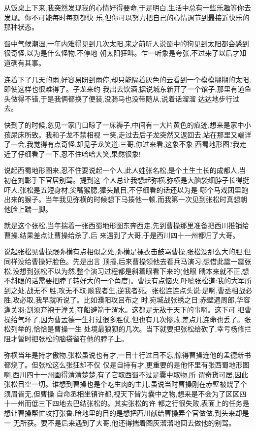 ﻿\documentclass[12pt,twocolumn]{article}
\begin{document}
从饭桌上下来,我突然发现我的心情好得要命,于是明白,生活中总有一些乐趣等你去发现。你不可能每时每刻都快
乐,但你可以努力把自己的心情调节到最接近快乐的那种状态。

蜀中气候潮湿,一年内难得见到几次太阳,来之前听人说蜀中的狗见到太阳都会感到很奇怪,以为是什么怪物,不停地
朝太阳狂叫。乍一听象是夸张,不过来了以后才知道确有其事。

连着下了几天的雨,好容易盼到雨停,却只能隔着灰色的云看到一个模模糊糊的太阳,即使这样也很难得了。子龙来约
我出去饮酒,据说城东新开了一个馆子,那里有道鱼头做得不错,于是我俩都换了便装,没骑马也没带随从,说着话溜溜
达达地步行过去。

快到了的时候,忽见一家门口晾了一床褥子,中间有一大片黄色的痕迹,想来是家中小孩尿床所致。我和子龙不禁相视
一笑,走过去后子龙突然又返回去,站在那里又端详了一会,我觉得有点奇怪,却见子龙笑道:三哥,你过来看,这象不象
西蜀地形图?我走近了仔细看了一下,忍不住哈哈大笑,果然很象!

说起西蜀地形图来,忍不住要说起一个人,此人姓张名松,是个土生土长的成都人,当初在刘彰手下官居别驾。提到这
个人总让我想起弥横,弥横是大脑袋细脖子长得挺吓人,张松是五短身材,尖嘴猴腮,獐头鼠目,不仔细看的话还以为是
哪个马戏团里跑出来的猴子。当年我见弥横的时候想下马揍他一顿,而我第一次见到张松时真想朝他脸上踹一脚。

就是这个张松,当年揣着一张西蜀地形图东奔西走,先到曹操那里准备把西川推销给曹操,结果差点让曹操给杀了,后
来遇到了大哥,于是西川四十一州都归了大哥。

说起张松见曹操跟弥横有点相似之处,弥横是裸衣击鼓骂曹操,张松没那么大的胆,但同样没给曹操好脸色。先是出言
顶撞,后来曹操领他去看兵马演习,想借此震一震张松,没想到张松不以为然,整个演习过程都是斜着眼看下来的(他眼
睛本来就不正,想不斜眼的话需要把脖子转好大的一个角度)。曹操有点恼火,吓唬张松道:我的大军所到之处,战无不
胜,攻无不取;顺我者生,逆我者死。张松连连点头说:是啊,曹丞相战必胜,攻必取,我早就听说了。比如濮阳攻吕布之
时,宛城战张绣之日;赤壁遇周郎,华容逢关羽;割须弃袍于潼关,夺船避箭于渭水。这都是无敌于天下的事啊。这下可
把曹操给气坏了,因为曹孟德一生打过很多胜仗,但也有几次惨败,差点儿连命也丢了。张松列举的,恰恰是曹操一生
处境最狼狈的几次。当下就要把张松给砍了,幸亏杨修拦阻才暂时把张松的脑袋留在他的脖子上。

弥横当年是持才傲物,张松虽说也有才,一目十行过目不忘,惊得曹操连他的孟德新书都烧了。但张松这么张狂却不仅
仅是自持有才,更重要的是他怀里有张西蜀地形图啊,西川四十一州画得清清楚楚,有了它取西蜀不过是囊中取物,所
谓奇货可居,因此张松目空一切。谁想到曹操也是个吃生肉的主儿,虽说当时曹操刚在赤壁被烧了个须眉皆无,但曹操
自命丞相坐镇许都,视天下皆为囊中之物,想来是不会为了区区四十一州而低三下四地去巴结张松的。其实张松的许
都之行很失败,表面上的任务是想让曹操帮忙攻打张鲁,暗地里的目的是想把西川献给曹操弄个官做做,到头来却是一
无所获。要不是后来遇到了大哥,他还得揣着图灰溜溜地回去做他的别驾。
\end{document}
